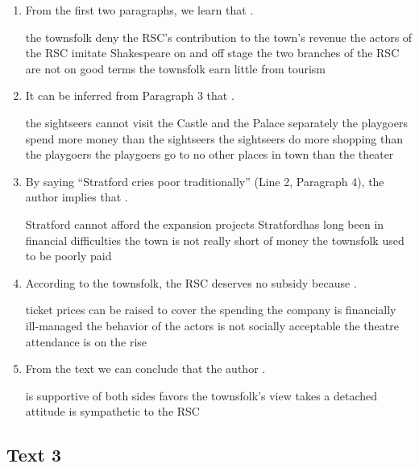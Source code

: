 \begin{enumerate}[resume]
	\item
From the first two paragraphs, we learn that \lineread.


\fourchoices
{the townsfolk deny the RSC's contribution to the town's revenue}
{the actors of the RSC imitate Shakespeare on and off stage}
{the two branches of the RSC are not on good terms}
{the townsfolk earn little from tourism}



\item
It can be inferred from Paragraph 3 that \lineread.


\fourchoices
{the sightseers cannot visit the Castle and the Palace separately}
{the playgoers spend more money than the sightseers}
{the sightseers do more shopping than the playgoers}
{the playgoers go to no other places in town than the theater}



\item
By saying ``Stratford cries poor traditionally'' (Line 2,
Paragraph 4), the author implies that \lineread.


\fourchoices
{Stratford cannot afford the expansion projects}
{Stratfordhas long been in financial difficulties}
{the town is not really short of money}
{the townsfolk used to be poorly paid}


\item
 According to the townsfolk, the RSC deserves no subsidy
because \lineread.


\fourchoices
{ticket prices can be raised to cover the spending}
{the company is financially ill-managed}
{the behavior of the actors is not socially acceptable}
{the theatre attendance is on the rise}


\item
From the text we can conclude that the author \lineread.


\fourchoices
{is supportive of both sides}
{favors the townsfolk's view}
{takes a detached attitude}
{is sympathetic to the RSC}



\end{enumerate}


\newpage
\subsection{Text 3}


